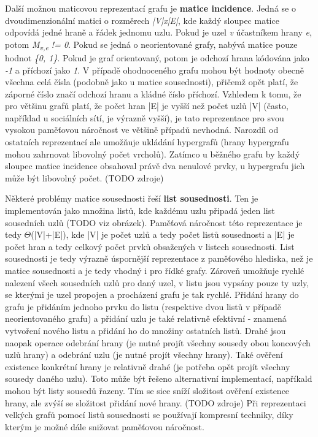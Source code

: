 Další možnou maticovou reprezentací grafu je \textbf{matice incidence}. Jedná se o dvoudimenzionální matici o rozměrech \textit{|V|x|E|}, kde každý sloupec matice odpovídá jedné hraně a řádek jednomu uzlu. Pokud je uzel \textit{v} účastníkem hrany \textit{e}, potom \textit{M\textsubscript{v,e} != 0}. Pokud se jedná o neorientované grafy, nabývá matice pouze hodnot \textit{\{0, 1\}}. Pokud je graf orientovaný, potom je odchozí hrana kódována jako \textit{-1} a příchozí jako \textit{1}. V případě ohodnoceného grafu mohou být hodnoty obecně všechna celá čísla (podobně jako u matice sousednosti), přičemž opět platí, že záporné číslo značí odchozí hranu a kládné číslo příchozí. Vzhledem k tomu, že pro většinu grafů platí, že počet hran |E| je vyšší než počet uzlů |V| (často, například u sociálních sítí, je výrazně vyšší), je tato reprezentace pro svou vysokou paměťovou náročnost ve většině případů nevhodná. Narozdíl od ostatních reprezentací ale umožňuje ukládání hypergrafů (hrany hypergrafu mohou zahrnovat libovolný počet vrcholů). Zatímco u běžného grafu by každý sloupec matice incidence obsahoval právě dva nenulové prvky, u hypergrafu jich může být libovolný počet. (TODO zdroje)

Některé problémy matice sousednosti řeší \textbf{list sousednosti}. Ten je implementován jako množina listů, kde každému uzlu připadá jeden list sousedních uzlů (TODO viz obrázek). Paměťová náročnost této reprezentace je tedy $\Theta$(|V|+|E|), kde |V| je počet uzlů a tedy počet listů sousednosti a |E| je počet hran a tedy celkový počet prvků obsažených v listech sousednosti. List sousednosti je tedy výrazně úspornější reprezentace z paměťového hlediska, než je matice sousednosti a je tedy vhodný i pro řídké grafy. Zároveň umožňuje rychlé nalezení všech sousedních uzlů pro daný uzel, v listu jsou vypsány pouze ty uzly, se kterými je uzel propojen a procházení grafu je tak rychlé. Přidání hrany do grafu je přidáním jednoho prvku do listu (respektive dvou listů v případě neorientovaného grafu) a přidání uzlu je také relativně efektivní - znamená vytvoření nového listu a přidání ho do množiny ostatních listů. Drahé jsou naopak operace odebrání hrany (je nutné projít všechny sousedy obou koncových uzlů hrany) a odebrání uzlu (je nutné projít všechny hrany). Také ověření existence konkrétní hrany je relativně drahé (je potřeba opět projít všechny sousedy daného uzlu). Toto může být řešeno alternativní implementací, napříkald mohou být listy sousedů řazeny. Tím se sice sníží složitost ověření existence hrany, ale zvýší se složitost přidání nové hrany. (TODO zdroje)
Při reprezentaci velkých grafů pomocí listů sousednosti se používají kompresní techniky, díky kterým je možné dále snižovat paměťovou náročnost.\cite{Boldi04} %

